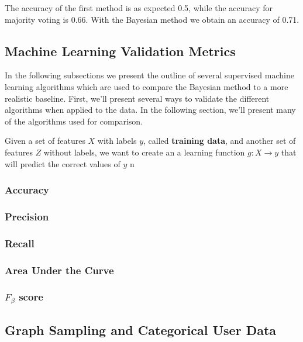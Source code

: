 The accuracy of the first method is as expected \num{0.5}, while the accuracy for majority voting is \num{0.66}.
With the Bayesian method we obtain an accuracy of \num{0.71}.

\subsection{Machine Learning Validation Metrics}

In the following subsections we present the outline of several supervised machine learning algorithms which are used to compare the Bayesian method to a more realistic baseline. First, we'll present several ways to validate the different algorithms when applied to the data. In the following section, we'll present many of the algorithms used for comparison.

Given a set of features $X$ with labels $y$, called \textbf{training data}, and another set of features $Z$ without labels, we want to create an a learning function $g : X \rightarrow y$ that will predict the correct values of $y$ n

\subsubsection{Accuracy}

\subsubsection{Precision}

\subsubsection{Recall}

\subsubsection{Area Under the Curve}

\subsubsection{$F_\beta$ score}

\subsection{Graph Sampling and Categorical User Data}
